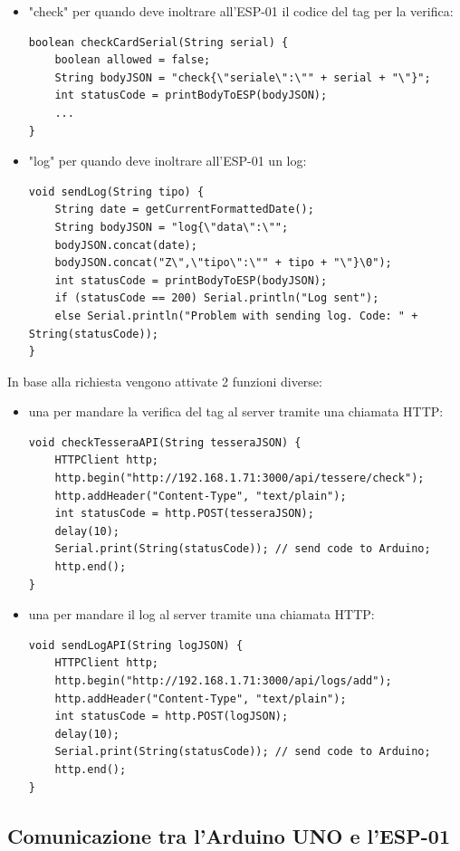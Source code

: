 \documentclass[12pt]{report}
\begin{document}
\begin{itemize}
	\item "check" per quando deve inoltrare all'ESP-01 il codice del tag per la verifica:
\begin{lstlisting}
boolean checkCardSerial(String serial) {
	boolean allowed = false;
	String bodyJSON = "check{\"seriale\":\"" + serial + "\"}";
	int statusCode = printBodyToESP(bodyJSON);
	...
}
\end{lstlisting}
	\item "log" per quando deve inoltrare all'ESP-01 un log:
\begin{lstlisting}
void sendLog(String tipo) {
	String date = getCurrentFormattedDate();
	String bodyJSON = "log{\"data\":\"";
	bodyJSON.concat(date);
	bodyJSON.concat("Z\",\"tipo\":\"" + tipo + "\"}\0");
	int statusCode = printBodyToESP(bodyJSON);
	if (statusCode == 200) Serial.println("Log sent");
	else Serial.println("Problem with sending log. Code: " + String(statusCode));
}
\end{lstlisting}
\end{itemize}
In base alla richiesta vengono attivate 2 funzioni diverse:
\begin{itemize}
	\item una per mandare la verifica del tag al server tramite una chiamata HTTP:
\begin{lstlisting}
void checkTesseraAPI(String tesseraJSON) {
	HTTPClient http;
	http.begin("http://192.168.1.71:3000/api/tessere/check");
	http.addHeader("Content-Type", "text/plain");
	int statusCode = http.POST(tesseraJSON);
	delay(10);
	Serial.print(String(statusCode)); // send code to Arduino;
	http.end();
}
\end{lstlisting}
	\item una per mandare il log al server tramite una chiamata HTTP: 
\begin{lstlisting}
void sendLogAPI(String logJSON) {
	HTTPClient http;
	http.begin("http://192.168.1.71:3000/api/logs/add");
	http.addHeader("Content-Type", "text/plain");
	int statusCode = http.POST(logJSON);
	delay(10);
	Serial.print(String(statusCode)); // send code to Arduino;
	http.end();
}
\end{lstlisting}
\end{itemize}

\subsection{Comunicazione tra l'Arduino UNO e l'ESP-01 }
\end{document}
